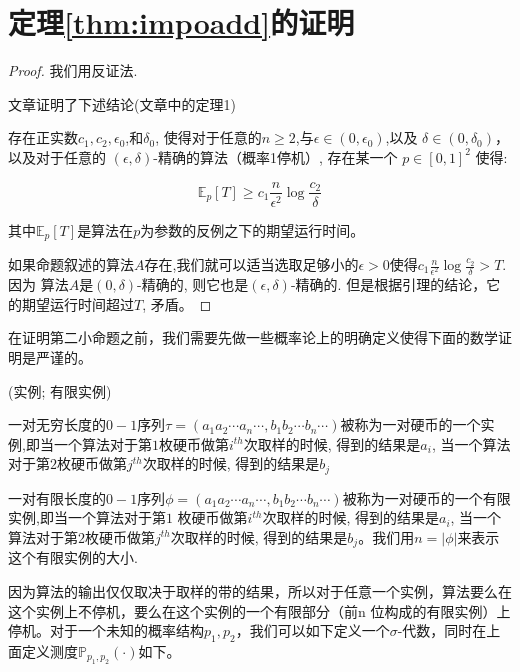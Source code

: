 \documentclass[bachelor]{thuthesis}
\begin{document}
\section{定理\ref{thm:impoadd}的证明}


\begin{proof}

我们用反证法.

文章\cite{lower}证明了下述结论(文章中的定理1)

\begin{lemma}

存在正实数$c_1,c_2,\epsilon_0$,和$\delta_0$, 使得对于任意的$n\ge 2$,与$\epsilon\in (0,\epsilon_0)$,以及 $\delta\in (0,\delta_0)$，以及对于任意的 $(\epsilon,\delta)$-精确的算法（概率1停机）, 存在某一个 $p\in [0,1]^2$ 使得:

\[\mathbb{E}_p[T]\ge c_1\frac{n}{\epsilon^2}\log\frac{c_2}{\delta}\]

\end{lemma}

其中$\mathbb{E}_p[T]$是算法在$p$为参数的反例之下的期望运行时间。

如果命题叙述的算法$A$存在,我们就可以适当选取足够小的$\epsilon>0$使得$c_1\frac{n}{\epsilon^2}\log\frac{c_2}{\delta}>T$.因为 算法$A$是$(0,\delta)$-精确的, 则它也是$(\epsilon,\delta)$-精确的. 但是根据引理的结论，它的期望运行时间超过$T$, 矛盾。

\end{proof}

在证明第二小命题之前，我们需要先做一些概率论上的明确定义使得下面的数学证明是严谨的。

\begin{definition}(实例; 有限实例)

一对无穷长度的$0-1$序列$\tau=(a_1a_2\cdots a_n\cdots,b_1b_2\cdots b_n\cdots)$被称为一对硬币的一个实例,即当一个算法对于第$1$枚硬币做第$i^{th}$次取样的时候, 得到的结果是$a_i$, 当一个算法对于第$2$枚硬币做第$j^{th}$次取样的时候, 得到的结果是$b_j$

一对有限长度的$0-1$序列$\phi=(a_1a_2\cdots a_n\cdots,b_1b_2\cdots b_n\cdots)$被称为一对硬币的一个有限实例,即当一个算法对于第$1$ 枚硬币做第$i^{th}$次取样的时候, 得到的结果是$a_i$, 当一个算法对于第$2$枚硬币做第$j^{th}$次取样的时候, 得到的结果是$b_j$。我们用$n=|\phi|$来表示这个有限实例的大小.

\end{definition}

因为算法的输出仅仅取决于取样的带的结果，所以对于任意一个实例，算法要么在这个实例上不停机，要么在这个实例的一个有限部分（前n 位构成的有限实例）上停机。对于一个未知的概率结构$p_1,p_2$，我们可以如下定义一个$\sigma$-代数，同时在上面定义测度$\mathbb{P}_{p_1,p_2}(\cdot)$如下。
\end{document}
